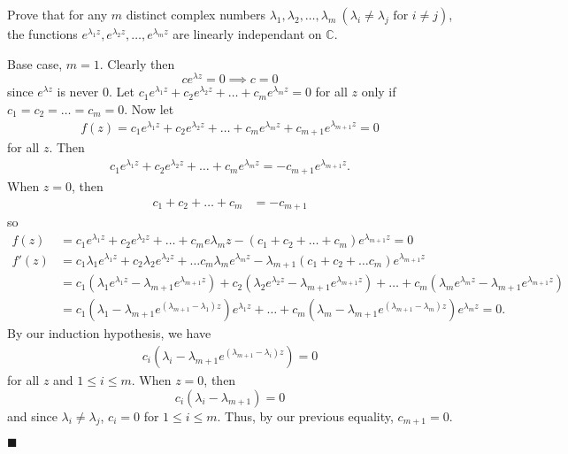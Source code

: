 \documentclass[12pt]{article}
\renewcommand{\qed}{\hfill$\blacksquare$}
\renewenvironment{proof}{\vspace{1em}\begin{addmargin}[2em]{0em}\begin{newproof}}{\end{newproof}\end{addmargin}\qed}
\newenvironment{exercise}[2][Exercise]{\begin{trivlist}
\item[\hskip \labelsep {\bfseries #1} \hskip \labelsep {\bfseries #2.}]}{\end{trivlist}}
\begin{document}
\begin{exercise}{3.2.22}
	Prove that for any $m$ distinct complex numbers $\lambda_1,\lambda_2,\ldots,\lambda_m~(\lambda_i \neq \lambda_j \text{ for } i\neq j)$, the functions $e^{\lambda_1z},e^{\lambda_2z},\ldots,e^{\lambda_mz}$ are linearly independant on $\mathbb{C}$.
\end{exercise}	
\begin{proof}
	Base case, $m = 1$. Clearly then
	\[
		ce^{\lambda z} = 0 \implies c = 0
	\]
	since $e^{\lambda z}$ is never 0. Let $c_1e^{\lambda_1z} + c_2e^{\lambda_2z} + \ldots + c_me^{\lambda_mz} = 0$ for all $z$ only if $c_1 = c_2 = \ldots = c_m = 0$. Now let
	\begin{align*}
		f(z) = c_1e^{\lambda_1z} + c_2e^{\lambda_2z} + \ldots + c_me^{\lambda_mz} + c_{m+1}e^{\lambda_{m+1}z} = 0
	\end{align*}
	for all $z$. Then
	\begin{align*}
		c_1e^{\lambda_1z} + c_2e^{\lambda_2z} + \ldots + c_me^{\lambda_mz} = -c_{m+1}e^{\lambda_{m+1}z}.
	\end{align*}
	When $z = 0$, then
	\begin{align*}
		c_1 + c_2 + \ldots + c_m &= -c_{m+1} 
	\end{align*}
	so
	\begin{align*}
		f(z) &= c_1e^{\lambda_1z} + c_2e^{\lambda_2z} + \ldots + c_me{\lambda_mz} - (c_1 + c_2 + \ldots + c_m)e^{\lambda_{m+1}z} = 0\\
		f'(z)&= c_1\lambda_1e^{\lambda_1z} + c_2\lambda_2e^{\lambda_2z} + \ldots c_m\lambda_me^{\lambda_mz} - \lambda_{m+1}(c_1 + c_2 + \ldots c_m)e^{\lambda_{m+1}z} \\
		     &= c_1(\lambda_1e^{\lambda_1z} - \lambda_{m+1}e^{\lambda_{m+1}z}) + c_2(\lambda_2e^{\lambda_2z} - \lambda_{m+1}e^{\lambda_{m+1}z}) + \ldots + c_m(\lambda_me^{\lambda_mz} - \lambda_{m+1}e^{\lambda_{m+1}z}) \\
		     &= c_1\left(\lambda_1 - \lambda_{m+1}e^{(\lambda_{m+1} - \lambda_1)z}\right)e^{\lambda_1z} + \ldots + c_m\left(\lambda_m - \lambda_{m+1}e^{(\lambda_{m+1} - \lambda_m)z}\right)e^{\lambda_mz} = 0.
	\end{align*}
	By our induction hypothesis, we have
	\begin{align*}
		c_i\left(\lambda_i - \lambda_{m+1}e^{(\lambda_{m+1} - \lambda_i)z}\right) = 0	
	\end{align*}
	for all $z$ and $1 \le i \le m$. When $z = 0$, then
	\[
		c_i(\lambda_i - \lambda_{m+1}) = 0
	\]
	and since $\lambda_i \neq \lambda_j$, $c_i = 0$ for $1 \le i \le m$. Thus, by our previous equality, $c_{m+1} = 0$.
	\end{proof}
\end{document}
